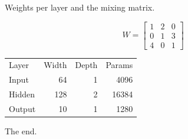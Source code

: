 \documentclass{article}
\begin{document}
Weights per layer and the mixing matrix.

\noindent\begin{minipage}{0.4\textwidth}
\[ W = \begin{bmatrix} 1 & 2 & 0 \\ 0 & 1 & 3 \\ 4 & 0 & 1 \end{bmatrix} \]
\end{minipage}\hfill
\begin{minipage}{0.55\textwidth}
\begin{tabular}{lrrr}
Layer & Width & Depth & Params \\
Input & 64 & 1 & 4096 \\
Hidden & 128 & 2 & 16384 \\
Output & 10 & 1 & 1280 \\
\end{tabular}
\end{minipage}

The end.
\end{document}
